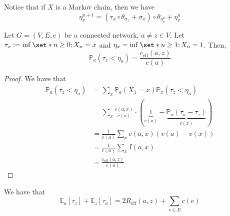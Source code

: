 \begin{lem}
    Notice that if $X$ is a Markov chain, then we have 
    \[\eta_x^{n+1} = (\tau_x \circ \theta_{\sigma_x} + \sigma_x) \circ \theta_{\eta_{x}^n} + \eta_{x}^n \]
\end{lem}


\begin{thm}[]

    Let \(G=(V,E,c)\) be a connected network, \(a\neq z \in V\). Let \(\tau_x:=\inf_{} \set*{n\geq 0 ; X_n=x}\) and \(\eta_{x}=\inf_{} \set*{n\geq 1 ; X_n=1}\). Then, 
    \[\mathbb{P}_a \left(\tau_z < \eta_a\right) = \frac{c_{\mathrm{eff}}(a,z)}{c(a)}\]
\end{thm}

\begin{proof}
    We have that 
    \begin{align*}
      \mathbb{P}_a(\tau_z < \eta_a) &= \sum_x \mathbb{P}_a(X_1=x)\mathbb{P}_x(\tau_z < \eta_a) \\
                                    &=\sum_x \frac{c(a,x)}{c(a)} \cdot (\underbrace{1}_{v(a)}-\underbrace{\mathbb{P}_x(\tau_a-\tau_z)}_{v(x)}) \\
                                    &=\frac{1}{c(a)} \sum_x c(a,x) \left(v(a)-v(x)\right) \\
                                    &=\frac{1}{c(a)}\sum_x I(a,x) \\
                                    &=\frac{c_{\mathrm{eff}}(a,z)}{c(a)}
    \end{align*}
    
\end{proof}


\begin{thm}
    We have that 
    \[\mathbb{E}_a \left[\tau_z\right] + \mathbb{E}_z \left[\tau_a\right] = 2 R_{\mathrm{eff}}(a,z) + \sum_{e\in E}c(e)\]
\end{thm}

